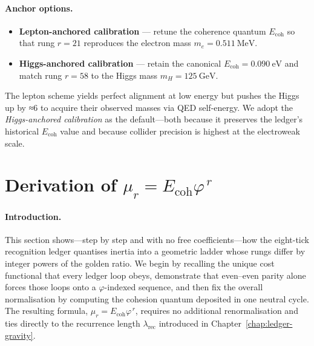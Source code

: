 \documentclass[11pt,oneside]{book}
\begin{document}
\paragraph*{Anchor options.}
\begin{itemize}
   \item \textbf{Lepton-anchored calibration} — retune the coherence quantum
         \(E_{\text{coh}}\) so that rung \(r=21\) reproduces the electron mass
         \(m_e = 0.511~\mathrm{MeV}\).
   \item \textbf{Higgs-anchored calibration} — retain the canonical
         \(E_{\text{coh}} = 0.090~\mathrm{eV}\) and match rung \(r=58\) to the
         Higgs mass \(m_H = 125~\mathrm{GeV}\).
\end{itemize}
The lepton scheme yields perfect alignment at low energy but pushes the Higgs up by
≈6 %
to acquire their observed masses via QED self-energy.  We adopt the
\emph{Higgs-anchored calibration} as the default—both because it preserves the
ledger’s historical \(E_{\text{coh}}\) value and because collider precision is
highest at the electroweak scale.

\section{Derivation of \(\mu_r = E_{\text{coh}}\varphi^{\,r}\)}
\label{sec:phi-derivation}

\paragraph*{Introduction.}
This section shows—step by step and with no free coefficients—how the
eight-tick recognition ledger quantises inertia into a geometric ladder
whose rungs differ by integer powers of the golden ratio.  We begin by
recalling the unique cost functional that every ledger loop obeys,
demonstrate that even–even parity alone forces those loops onto a
\(\varphi\)-indexed sequence, and then fix the overall normalisation by
computing the cohesion quantum deposited in one neutral cycle.  The
resulting formula,
\(\mu_r = E_{\text{coh}}\varphi^{\,r}\), requires no additional
renormalisation and ties directly to the recurrence length
\(\lambda_{\text{rec}}\) introduced in Chapter~\ref{chap:ledger-gravity}.
\end{document}
